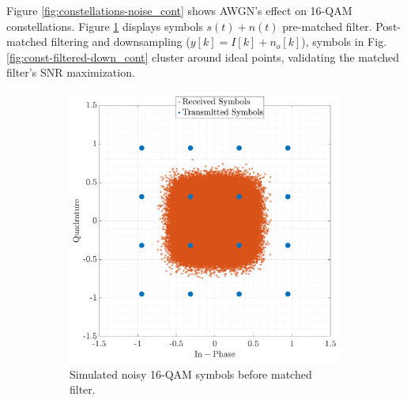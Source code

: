 \documentclass[11pt]{article}
\begin{document}
	Figure \ref{fig:constellations-noise_cont} shows AWGN's effect on 16-QAM constellations. Figure \ref{fig:const-noisy_cont} displays symbols $s(t)+n(t)$ pre-matched filter. Post-matched filtering and downsampling ($y[k]=I[k]+n_o[k]$), symbols in Fig. \ref{fig:const-filtered-down_cont} cluster around ideal points, validating the matched filter's SNR maximization.
	
	\begin{figure}[H]
		\centering
		\begin{subfigure}{0.48\textwidth}
			\includegraphics[width=\linewidth]{Images/const-noisy.png}
			\caption{Simulated noisy 16-QAM symbols before matched filter.}
			\label{fig:const-noisy_cont}
		\end{subfigure}\hfill
		\begin{subfigure}{0.48\textwidth}

\end{subfigure}
\end{figure}
\end{document}
